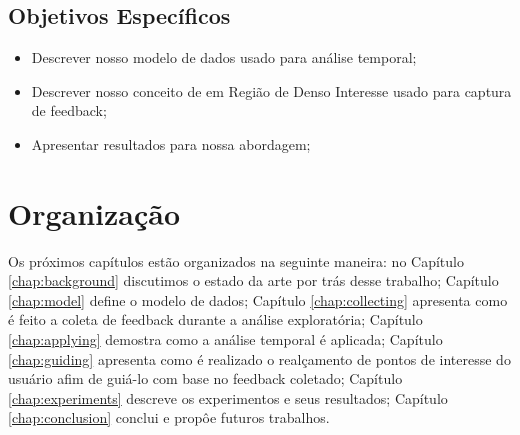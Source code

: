 \subsection{Objetivos Específicos}

\begin{itemize}
	\item Descrever nosso modelo de dados usado para análise temporal;
	\item Descrever nosso conceito de em Região de Denso Interesse usado para captura de feedback;
	\item Apresentar resultados para nossa abordagem;
\end{itemize}

\section{Organização}

Os próximos capítulos estão organizados na seguinte maneira: no Capítulo \ref{chap:background} discutimos o estado da arte por trás desse trabalho; Capítulo \ref{chap:model} define o modelo de dados; Capítulo \ref{chap:collecting} apresenta como é feito a coleta de feedback durante a análise exploratória; Capítulo \ref{chap:applying} demostra como a análise temporal é aplicada; Capítulo \ref{chap:guiding} apresenta como é realizado o realçamento de pontos de interesse do usuário afim de guiá-lo com base no feedback coletado; Capítulo \ref{chap:experiments} descreve os experimentos e seus resultados; Capítulo \ref{chap:conclusion} conclui e propôe futuros trabalhos.
